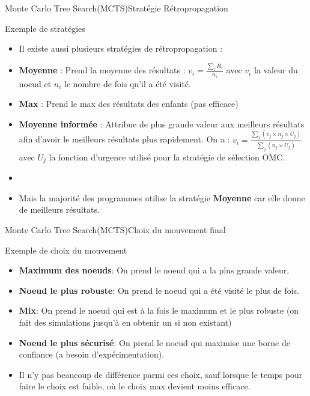 \begin{frame}{Monte Carlo Tree Search(MCTS)}{Stratégie Rétropropagation}
	\begin{block}{Exemple de stratégies}
		\begin{itemize}
			\item Il existe aussi plusieurs stratégies de rétropropagation :
			\item \textbf{Moyenne} : Prend la moyenne des résultats : $v_{i} = \frac{\sum_{i}^{}R_{i}}{n_{i}}$ avec $v_{i}$ la valeur du noeud et $n_i$ le nombre de fois qu'il a été visité.
			\item \textbf{Max} : Prend le max des résultats des enfants (pas efficace)
			\item \textbf{Moyenne informée} : Attribue de plus grande valeur aux meilleurs résultats afin d'avoir le meilleurs résultats plus rapidement.
			On a : $v_{i} = \frac{\sum_{j}^{}(v_{j}\times n_{j}\times U_{j})}{\sum_{j}^{}(n_{j}\times U_{j})}$ avec $U_{j}$ la fonction d'urgence utilisé pour la stratégie de sélection OMC.
			\item \
			\item Mais la majorité des programmes utilise la stratégie \textbf{Moyenne} car elle donne de meilleurs résultats.
		\end{itemize}
	\end{block}
\end{frame}

\begin{frame}{Monte Carlo Tree Search(MCTS)}{Choix du mouvement final}
	\begin{block}{Exemple de choix du mouvement}
		\begin{itemize}
			\item \textbf{Maximum des noeuds}: On prend le noeud qui a la plus grande valeur.
			\item \textbf{Noeud le plus robuste}: On prend le noeud qui a été visité le plus de fois.
			\item \textbf{Mix}: On prend le noeud qui est à la fois le maximum et le plus robuste (on fait des simulations jusqu'à en obtenir un si non existant)
			\item \textbf{Noeud le plus sécurisé}: On prend le noeud qui maximise une borne de confiance (a besoin d'expérimentation).
			\item Il n'y pas beaucoup de différence parmi ces choix, sauf lorsque le temps pour faire le choix est faible, où le choix max devient moins efficace.
		\end{itemize}
	\end{block}
\end{frame}

